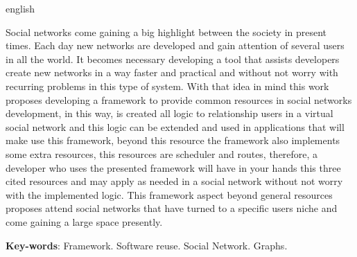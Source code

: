 \begin{resumo}[Abstract]
 \begin{otherlanguage*}{english}
   
   Social networks come gaining a big highlight between the society in present times. Each day new networks are developed and gain attention of several users in all the world. It becomes necessary developing a tool that assists developers create new networks in a way faster and practical and without not worry with recurring problems in this type of system. With that idea in mind this work proposes developing a framework to provide common resources in social networks development, in this way, is created all logic to relationship users in a virtual social network and this logic can be extended and used in applications that will make use this framework, beyond this resource the framework also implements some extra resources, this resources are scheduler and routes, therefore, a developer who uses the presented framework will have in your hands this three cited resources and may apply as needed in a social network without not worry with the implemented logic. This framework aspect beyond general resources proposes attend social networks that have turned to a specific users niche and come gaining a large space presently.

   \vspace{\onelineskip}
 
   \noindent 
   \textbf{Key-words}: Framework. Software reuse. Social Network. Graphs.
 \end{otherlanguage*}
\end{resumo}
